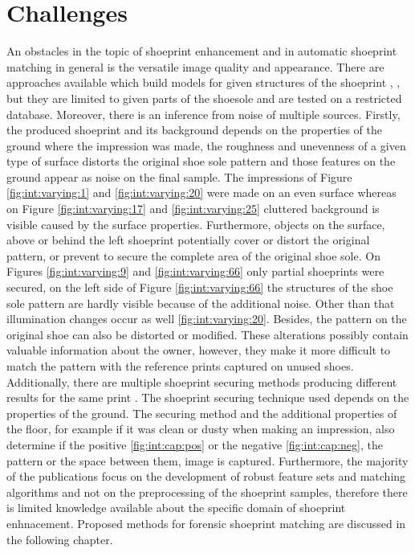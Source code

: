 \documentclass[draft,final]{vutinfth} %
\begin{document}
\section{Challenges}
\par
An obstacles in the topic of shoeprint enhancement and in automatic shoeprint matching in general is the versatile image quality and appearance.
There are approaches available which build models for given structures of the shoeprint \cite{tang2010footwear}, \cite{alizadeh2017automatic}, but they are limited to given parts of the shoesole and are tested on a restricted database.
Moreover, there is an inference from noise of multiple sources.
Firstly, the produced shoeprint and its background depends on the properties of the ground where the impression was made, the roughness and unevenness of a given type of surface distorts the original shoe sole pattern and those features on the ground appear as noise on the final sample.
The impressions of Figure \ref{fig:int:varying:1} and \ref{fig:int:varying:20} were made on an even surface whereas on Figure \ref{fig:int:varying:17} and \ref{fig:int:varying:25} cluttered background is visible caused by the surface properties.
Furthermore, objects on the surface, above or behind the left shoeprint potentially cover or distort the original pattern, or prevent to secure the complete area of the original shoe sole.
On Figures \ref{fig:int:varying:9} and \ref{fig:int:varying:66} only partial shoeprints were secured, on the left side of Figure \ref{fig:int:varying:66} the structures of the shoe sole pattern are hardly visible because of the additional noise.
Other than that illumination changes occur as well \ref{fig:int:varying:20}.
Besides, the pattern on the original shoe can also be distorted or modified.
These alterations possibly contain valuable information about the owner, however, they make it more difficult to match the pattern with the reference prints captured on unused shoes.
Additionally, there are multiple shoeprint securing methods producing different results for the same print \cite{katireddy2017novel}. 
The shoeprint securing technique used depends on the properties of the ground. 
The securing method and the additional properties of the floor, for example if it was clean or dusty when making an impression, also determine if the positive \ref{fig:int:cap:pos} or the negative \ref{fig:int:cap:neg}, the pattern or the space between them, image is captured.
Furthermore, the majority of the publications focus on the development of robust feature sets and matching algorithms and not on the preprocessing of the shoeprint samples, therefore there  is limited knowledge available about the specific domain of shoeprint enhnacement.
Proposed methods for forensic shoeprint matching are discussed in the following chapter.
\end{document}
